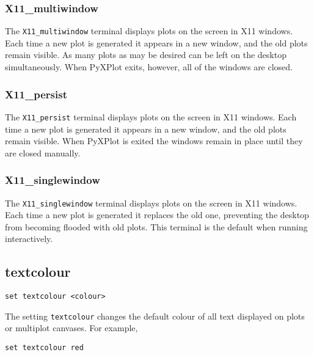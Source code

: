 \subsubsection{X11\_multiwindow}

The {\tt X11\_multiwindow} terminal displays plots on the screen in X11
windows. Each time a new plot is generated it appears in a new window, and the
old plots remain visible.  As many plots as may be desired can be left on the
desktop simultaneously. When PyXPlot exits, however, all of the windows are
closed.

\subsubsection{X11\_persist}

The {\tt X11\_persist} terminal displays plots on the screen in X11 windows.
Each time a new plot is generated it appears in a new window, and the old plots
remain visible.  When PyXPlot is exited the windows remain in place until they
are closed manually.

\subsubsection{X11\_singlewindow}

The {\tt X11\_singlewindow} terminal displays plots on the screen in X11
windows. Each time a new plot is generated it replaces the old one, preventing
the desktop from becoming flooded with old plots. This terminal is the default
when running interactively.


\subsection{textcolour}

\begin{verbatim}
set textcolour <colour>
\end{verbatim}

The setting {\tt textcolour} changes the default colour of all text displayed
on plots or multiplot canvases.  For example,

\begin{verbatim}
set textcolour red
\end{verbatim}

